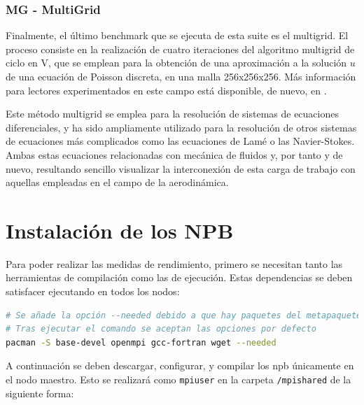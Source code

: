 \subsubsection{MG - MultiGrid}
Finalmente, el último benchmark que se ejecuta de esta suite es el multigrid. El proceso consiste en la realización de cuatro iteraciones del algoritmo multigrid de ciclo en V, que se emplean para la obtención de una aproximación a la solución $u$ de una ecuación de Poisson discreta, en una malla 256x256x256. Más información para lectores experimentados en este campo está disponible, de nuevo, en \cite[2.2.2]{benchmarks1994technical}.

Este método multigrid se emplea para la resolución de sistemas de ecuaciones diferenciales, y ha sido ampliamente utilizado para la resolución de otros sistemas de ecuaciones más complicados como las ecuaciones de Lamé o las Navier-Stokes. Ambas estas ecuaciones relacionadas con mecánica de fluidos y, por tanto y de nuevo, resultando sencillo visualizar la interconexión de esta carga de trabajo con aquellas empleadas en el campo de la aerodinámica.  

\section{Instalación de los NPB}
Para poder realizar las medidas de rendimiento, primero se necesitan tanto las herramientas de compilación como las de ejecución. Estas dependencias se deben satisfacer ejecutando en todos los nodos:

\begin{lstlisting}[language=bash]
# Se añade la opción --needed debido a que hay paquetes del metapaquete base-devel que ya están instalados, y no es necesario reinstalar.
# Tras ejecutar el comando se aceptan las opciones por defecto
pacman -S base-devel openmpi gcc-fortran wget --needed
\end{lstlisting}

A continuación se deben descargar, configurar, y compilar los \acrlong{npb} únicamente en el nodo maestro. Esto se realizará como \texttt{mpiuser} en la carpeta \texttt{/mpishared} de la siguiente forma:

